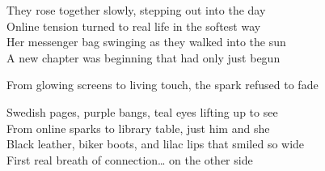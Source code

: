 \begin{lyrics}
They rose together slowly, stepping out into the day\\  
Online tension turned to real life in the softest way\\  
Her messenger bag swinging as they walked into the sun\\  
A new chapter was beginning that had only just begun  

From glowing screens to living touch, the spark refused to fade  

Swedish pages, purple bangs, teal eyes lifting up to see\\  
From online sparks to library table, just him and she\\  
Black leather, biker boots, and lilac lips that smiled so wide\\  
First real breath of connection… on the other side
\end{lyrics}

